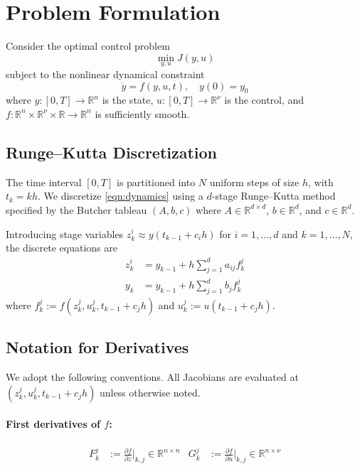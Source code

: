 \documentclass[11pt]{article}
\newcommand{\RR}{\mathbb{R}}
\newcommand{\pder}[2]{\frac{\partial #1}{\partial #2}}
\begin{document}
\section{Problem Formulation}

Consider the optimal control problem
\begin{equation}
\min_{y,u} J(y,u)
\end{equation}
subject to the nonlinear dynamical constraint
\begin{equation}
\label{eqn:dynamics}
\dot{y} = f(y,u,t), \quad y(0) = y_0
\end{equation}
where $y:[0,T]\to\RR^n$ is the state, $u:[0,T]\to\RR^\nu$ is the control, and $f:\RR^n\times\RR^\nu\times\RR\to\RR^n$ is sufficiently smooth.

\subsection{Runge--Kutta Discretization}

The time interval $[0,T]$ is partitioned into $N$ uniform steps of size $h$, with $t_k = kh$. We discretize \eqref{eqn:dynamics} using a $d$-stage Runge--Kutta method specified by the Butcher tableau $(A,b,c)$ where $A\in\RR^{d\times d}$, $b\in\RR^d$, and $c\in\RR^d$.

Introducing stage variables $z_k^i \approx y(t_{k-1}+c_i h)$ for $i=1,\ldots,d$ and $k=1,\ldots,N$, the discrete equations are
\begin{equation}
\label{eqn:rk_state}
\boxed{
\begin{aligned}
z_k^i &= y_{k-1} + h \sum_{j=1}^d a_{ij} f_k^j \\[4pt]
y_k &= y_{k-1} + h \sum_{j=1}^d b_j f_k^j
\end{aligned}
}
\end{equation}
where $f_k^j := f(z_k^j, u_k^j, t_{k-1}+c_j h)$ and $u_k^j := u(t_{k-1}+c_j h)$.

\subsection{Notation for Derivatives}

We adopt the following conventions. All Jacobians are evaluated at $(z_k^j, u_k^j, t_{k-1}+c_j h)$ unless otherwise noted.

\paragraph{First derivatives of $f$:}
\begin{align}
F_k^j &:= \pder{f}{z}\bigg|_{k,j} \in \RR^{n\times n} &
G_k^j &:= \pder{f}{u}\bigg|_{k,j} \in \RR^{n\times \nu}
\end{align}
\end{document}
